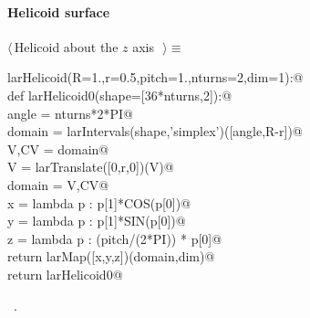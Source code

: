 \documentclass[11pt,oneside]{article}	%
\begin{document}
\paragraph{Helicoid surface}
\begin{flushleft} \small \label{scrap9}
$\langle\,$Helicoid about the $z$ axis\nobreak\ {\footnotesize {}}$\,\rangle\equiv$
\vspace{-1ex}
\begin{list}{}{} \item
\mbox{}\verb@def larHelicoid(R=1.,r=0.5,pitch=1.,nturns=2,dim=1):@\\
\mbox{}\verb@   def larHelicoid0(shape=[36*nturns,2]):@\\
\mbox{}\verb@      angle = nturns*2*PI@\\
\mbox{}\verb@      domain = larIntervals(shape,'simplex')([angle,R-r])@\\
\mbox{}\verb@      V,CV = domain@\\
\mbox{}\verb@      V = larTranslate([0,r,0])(V)@\\
\mbox{}\verb@      domain = V,CV@\\
\mbox{}\verb@      x = lambda p : p[1]*COS(p[0])@\\
\mbox{}\verb@      y = lambda p : p[1]*SIN(p[0])@\\
\mbox{}\verb@      z = lambda p : (pitch/(2*PI)) * p[0]@\\
\mbox{}\verb@      return larMap([x,y,z])(domain,dim)@\\
\mbox{}\verb@   return larHelicoid0@\\
\mbox{}\verb@@{\NWsep}
\end{list}
\vspace{-1ex}
\footnotesize\addtolength{\baselineskip}{-1ex}
\begin{list}{}{\setlength{\itemsep}{-\parsep}\setlength{\itemindent}{-\leftmargin}}
\item \NWtxtMacroRefIn\ .
\end{list}
\end{flushleft}
\end{document}
